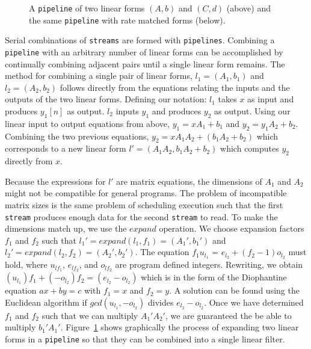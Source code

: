 \begin{figure}
\center
\epsfxsize=3.0in
\caption{A {\tt pipeline} of two linear forms $(A,b)$ and $(C,d)$ (above) and the same {\tt pipeline} with rate matched forms (below).}
\label{fig:combining-pipeline}
\vspace{-12pt}
\end{figure}

Serial combinations of {\tt streams} are formed with {\tt pipelines}.
Combining a {\tt pipeline} with an arbitrary number of linear forms
can be accomplished by continually combining adjacent pairs until a
single linear form remains.  The method for combining a single pair of
linear forms, $l_1=(A_1,b_1)$ and $l_2=(A_2,b_2)$ follows directly
from the equations relating the inputs and the outputs of the two
linear forms. Defining our notation: $l_1$ takes $x$ as input and
produces $y_1[n]$ as output. $l_2$ inputs $y_1$ and produces $y_2$ as
output.  Using our linear input to output equations from above, $y_1 =
xA_1 + b_1$ and $y_2 = y_1A_2 + b_2$. Combining the two previous
equations, $y_2 = xA_1A_2 + (b_1A_2 + b_2)$ which corresponds to a new
linear form $l'=(A_1A_2, b_1A_2+b_2)$ which computes $y_2$ directly
from $x$.

Because the expressions for $l'$ are matrix equations, the dimensions
of $A_1$ and $A_2$ might not be compatible for general programs.  The
problem of incompatible matrix sizes is the same problem of scheduling
execution such that the first {\tt stream} produces enough data for
the second {\tt stream} to read. To make the dimensions match up, we
use the $expand$ operation. We choose expansion factors $f_1$ and
$f_2$ such that $l_1' = expand(l_1,f_1) = (A_1',b_1')$ and $l_2' =
expand(l_2,f_2) = (A_2',b_2')$.  The equation $f_1u_{l_1}$ = $e_{l_2}
+ (f_2-1)o_{l_2}$ must hold, where $u_{lf_1}$, $e_{lf_2}$, and
$o_{lf_2}$ are program defined integers. Rewriting, we obtain
$(u_{l_1})f_1 + (-o_{l_2})f_2 = (e_{l_2}-o_{l_2})$ which is in the
form of the Diophantine equation $ax+by=c$ with $f_1=x$ and $f_2=y$. A
solution can be found using the Euclidean algorithm if
$gcd(u_{l_1},-o_{l_2})$ divides
$e_{l_2}-o_{l_2}$\cite{theory-of-numbers}. Once we have determined
$f_1$ and $f_2$ such that we can multiply $A_1'A_2'$, we are
guaranteed the be able to multiply $b_1'A_1'$.
Figure~\ref{fig:combining-pipeline} shows graphically the process of
expanding two linear forms in a {\tt pipeline} so that they can be
combined into a single linear filter.

